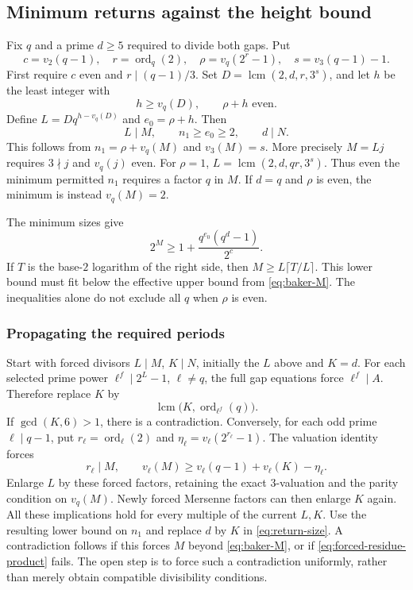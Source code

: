 \documentclass[11pt]{article}
\begin{document}
\subsection{Minimum returns against the height bound}
\label{sec:minimum-returns}
Fix $q$ and a prime $d\ge5$ required to divide both gaps. Put
\[
c=v_2(q-1),\quad r=\operatorname{ord}_q(2),\quad
\rho=v_q(2^r-1),\quad s=v_3(q-1)-1.
\]
First require $c$ even and $r\mid(q-1)/3$.
Set $D=\operatorname{lcm}(2,d,r,3^s)$, and let $h$ be the least
integer with
\[
h\ge v_q(D),\qquad \rho+h\text{ even}.
\]
Define $L=Dq^{h-v_q(D)}$ and $e_0=\rho+h$. Then
\begin{equation}\label{eq:minimum-return}
\boxed{L\mid M,\qquad n_1\ge e_0\ge2,\qquad d\mid N.}
\end{equation}
This follows from $n_1=\rho+v_q(M)$ and
$v_3(M)=s$. More precisely $M=Lj$ requires
$3\nmid j$ and $v_q(j)$ even.
For $\rho=1$, $L=\operatorname{lcm}(2,d,qr,3^s)$.
Thus even the minimum permitted $n_1$ requires a factor $q$ in $M$.
If $d=q$ and $\rho$ is even, the minimum is instead $v_q(M)=2$.

The minimum sizes give
\begin{equation}\label{eq:return-size}
2^M\ge1+\frac{q^{e_0}(q^d-1)}{2^c}.
\end{equation}
If $T$ is the base-$2$ logarithm of the right side, then
$M\ge L\lceil T/L\rceil$. This lower bound must fit below the
effective upper bound from \eqref{eq:baker-M}.
The inequalities alone do not exclude all $q$ when $\rho$ is even.

\subsubsection*{Propagating the required periods}
Start with forced divisors $L\mid M$, $K\mid N$, initially the $L$
above and $K=d$. For each selected prime power $\ell^f\mid2^L-1$,
$\ell\ne q$, the full gap equations force $\ell^f\mid A$. Therefore
replace $K$ by
\[
\operatorname{lcm}\bigl(K,\operatorname{ord}_{\ell^f}(q)\bigr).
\]
If $\gcd(K,6)>1$, there is a contradiction.
Conversely, for each odd prime $\ell\mid q-1$, put
$r_\ell=\operatorname{ord}_\ell(2)$ and
$\eta_\ell=v_\ell(2^{r_\ell}-1)$. The valuation identity forces
\[
r_\ell\mid M,\qquad
v_\ell(M)\ge v_\ell(q-1)+v_\ell(K)-\eta_\ell.
\]
Enlarge $L$ by these forced factors, retaining the exact $3$-valuation
and the parity condition on $v_q(M)$. Newly forced Mersenne factors
can then enlarge $K$ again. All these implications hold for every
multiple of the current $L,K$.
Use the resulting lower bound on $n_1$ and replace $d$ by $K$ in
\eqref{eq:return-size}. A contradiction follows if this forces $M$
beyond \eqref{eq:baker-M}, or if \eqref{eq:forced-residue-product} fails.
The open step is to force such a contradiction uniformly, rather
than merely obtain compatible divisibility conditions.
\end{document}
